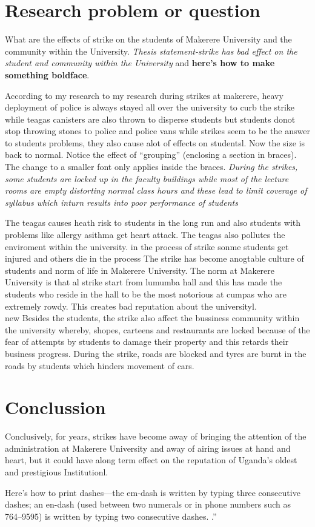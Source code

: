 \documentclass{article}                    %
\begin{document}
 
\section{{\textbf{Research problem or question}}}                %
What are the effects of strike on the students of Makerere University and the community within the University.
\textit{Thesis statement-strike has bad effect on the student and community within the University} and 
\textbf{here's how to make something boldface}.

{\small According to my research to my research during strikes at makerere, heavy deployment of police is always stayed all over the university to curb the strike while teagas canisters are also thrown to disperse students but students donot stop throwing stones to police and police vans while strikes seem to be the answer to students problems, they also cause alot of effects on studentsl.} Now the size
is back to normal.  
Notice the effect of ``grouping'' (enclosing a section in braces). 
The change to a smaller font only applies inside the braces. 
\textit{During the strikes, some students are locked up in the faculty buildings while most of the lecture rooms are empty distorting normal class hours and these lead to limit coverage of syllabus which inturn results into poor performance of students}
  
{\small The teagas causes heath risk to students in the long run and also students with problems like allergy asithma get heart attack. The teagas also pollutes the enviroment within the university. in the process of strike sonme students get injured and others die in the process}
{\small The strike has become anogtable culture of students and norm of life in Makerere University. The norm at Makerere University is that al strike start from lumumba hall and this has made the students who reside in the hall to be the most notorious at cumpas who are extremely rowdy. This creates bad reputation about the universityl.}
\\new
{\small Besides the students, the strike also affect the bussiness community within the university whereby, shopes, carteens and restaurants are locked because of the fear of attempts by students to damage their property and this retards their business progress.}
{\small During the strike, roads are blocked and tyres are burnt in the roads by students which hinders movement of cars.}
\section{{\textbf{Conclussion}}}
{\small Conclusively, for years, strikes have become away of bringing the attention of the administration at Makerere University and away of airing issues at hand and heart, but it could have along term effect on the reputation of Uganda's oldest and prestigious Institutionl.} 


Here's how to print dashes---the em-dash is written by typing three 
consecutive dashes; an en-dash (used between two numerals or in phone
numbers such as 764--9595) is written by typing two consecutive dashes. 
.''
 
\end{document}
